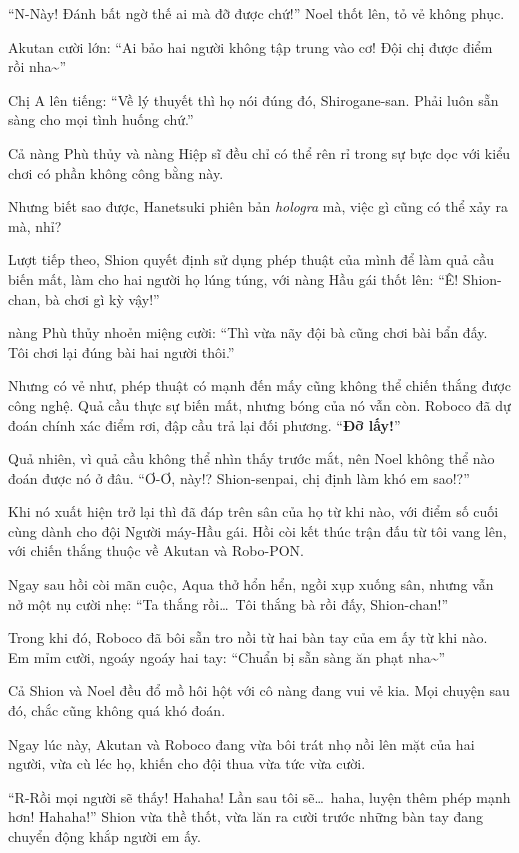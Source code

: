 \documentclass[../main.tex]{subfiles}
\begin{document}
``N-Này! Đánh bất ngờ thế ai mà đỡ được chứ!'' Noel thốt lên, tỏ vẻ không phục.

Akutan cười lớn: ``Ai bảo hai người không tập trung vào cơ! Đội chị được điểm rồi nha\~{}''

Chị A lên tiếng: ``Về lý thuyết thì họ nói đúng đó, Shirogane-san. Phải luôn sẵn sàng cho mọi tình huống chứ.''

Cả nàng Phù thủy và nàng Hiệp sĩ đều chỉ có thể rên rỉ trong sự bực dọc với kiểu chơi có phần không công bằng này.

Nhưng biết sao được, Hanetsuki phiên bản \textit{hologra} mà, việc gì cũng có thể xảy ra mà, nhỉ?

Lượt tiếp theo, Shion quyết định sử dụng phép thuật của mình để làm quả cầu biến mất, làm cho hai người họ lúng túng, với nàng Hầu gái thốt lên: ``Ê! Shion-chan, bà chơi gì kỳ vậy!''

nàng Phù thủy nhoẻn miệng cười: ``Thì vừa nãy đội bà cũng chơi bài bẩn đấy. Tôi chơi lại đúng bài hai người thôi.''

Nhưng có vẻ như, phép thuật có mạnh đến mấy cũng không thể chiến thắng được công nghệ. Quả cầu thực sự biến mất, nhưng bóng của nó vẫn còn. Roboco đã dự đoán chính xác điểm rơi, đập cầu trả lại đối phương. ``\textbf{Đỡ lấy!}''

Quả nhiên, vì quả cầu không thể nhìn thấy trước mắt, nên Noel không thể nào đoán được nó ở đâu. ``Ơ-Ơ, này!? Shion-senpai, chị định làm khó em sao!?''

Khi nó xuất hiện trở lại thì đã đáp trên sân của họ từ khi nào, với điểm số cuối cùng dành cho đội Người máy-Hầu gái. Hồi còi kết thúc trận đấu từ tôi vang lên, với chiến thắng thuộc về Akutan và Robo-PON.

Ngay sau hồi còi mãn cuộc, Aqua thở hổn hển, ngồi xụp xuống sân, nhưng vẫn nở một nụ cười nhẹ: ``Ta thắng rồi\dots\ Tôi thắng bà rồi đấy, Shion-chan!''

Trong khi đó, Roboco đã bôi sẵn tro nồi từ hai bàn tay của em ấy từ khi nào. Em mỉm cười, ngoáy ngoáy hai tay: ``Chuẩn bị sẵn sàng ăn phạt nha\~{}''

Cả Shion và Noel đều đổ mồ hôi hột với cô nàng đang vui vẻ kia. Mọi chuyện sau đó, chắc cũng không quá khó đoán.

Ngay lúc này, Akutan và Roboco đang vừa bôi trát nhọ nồi lên mặt của hai người, vừa cù léc họ, khiến cho đội thua vừa tức vừa cười.

``R-Rồi mọi người sẽ thấy! Hahaha! Lần sau tôi sẽ\dots\ haha, luyện thêm phép mạnh hơn! Hahaha!'' Shion vừa thề thốt, vừa lăn ra cười trước những bàn tay đang chuyển động khắp người em ấy.
\end{document}
